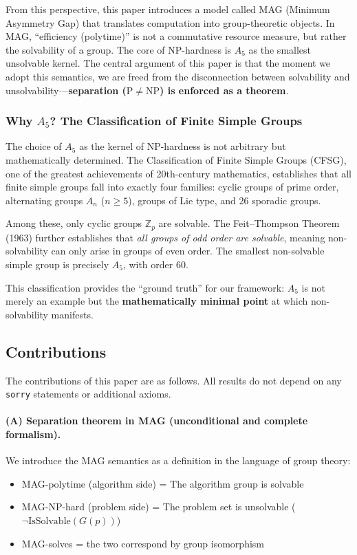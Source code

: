 \documentclass[11pt,a4paper]{article}
\theoremstyle{plain}
\theoremstyle{definition}
\newcommand{\Aalt}{A_5}
\newcommand{\IsSolvable}{\mathrm{IsSolvable}}
\newcommand{\lean}[1]{\texttt{#1}}
\begin{document}
From this perspective, this paper introduces a model called MAG (Minimum Asymmetry Gap) that translates computation into group-theoretic objects. In MAG, ``efficiency (polytime)'' is not a commutative resource measure, but rather the solvability of a group. The core of NP-hardness is $\Aalt$ as the smallest unsolvable kernel. The central argument of this paper is that the moment we adopt this semantics, we are freed from the disconnection between solvability and unsolvability---\textbf{separation ($\mathrm{P} \neq \mathrm{NP}$) is enforced as a theorem}.


\subsubsection{Why $A_5$? The Classification of Finite Simple Groups}

The choice of $A_5$ as the kernel of NP-hardness is not arbitrary but mathematically 
determined. The Classification of Finite Simple Groups (CFSG), one of the greatest 
achievements of 20th-century mathematics, establishes that all finite simple groups 
fall into exactly four families: cyclic groups of prime order, alternating groups 
$A_n$ ($n \ge 5$), groups of Lie type, and 26 sporadic groups.

Among these, only cyclic groups $\mathbb{Z}_p$ are solvable. The Feit--Thompson 
Theorem (1963) further establishes that \emph{all groups of odd order are solvable}, 
meaning non-solvability can only arise in groups of even order. The smallest 
non-solvable simple group is precisely $A_5$, with order 60.

This classification provides the ``ground truth'' for our framework: $A_5$ is not 
merely an example but the \textbf{mathematically minimal point} at which 
non-solvability manifests.

\subsection{Contributions}

The contributions of this paper are as follows. All results do not depend on any \lean{sorry} statements or additional axioms.

\paragraph{(A) Separation theorem in MAG (unconditional and complete formalism).}
We introduce the MAG semantics as a definition in the language of group theory:
\begin{itemize}[nosep]
\item MAG-polytime (algorithm side) = The algorithm group is solvable
\item MAG-NP-hard (problem side) = The problem set is unsolvable ($\neg \IsSolvable(G(p))$)
\item MAG-solves = the two correspond by group isomorphism
\end{itemize}
\end{document}
